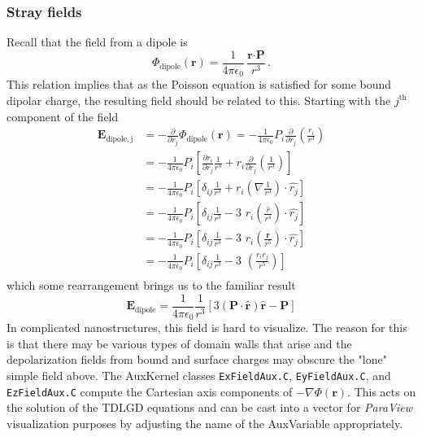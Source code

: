 \documentclass[16pt]{article} %
\begin{document}
\subsubsection{Stray fields}
%
Recall that the field from a dipole is
%
$$\Phi_\mathrm{dipole}\left(\textbf{r} \right) = \frac{1}{4\pi \epsilon_0} \frac{\textbf{r} \cdot \textbf{P}}{r^3}.$$
%
This relation implies that as the Poisson equation is satisfied for some bound dipolar charge, the resulting field should be related to this.
%
Starting with the $j^\mathrm{th}$ component of the field
%
\begin{align}\tag{123}
\textbf{E}_\mathrm{dipole,j} &= - \frac{\partial}{\partial r_j} \Phi_\mathrm{dipole} \left(\textbf{r} \right) = - \frac{1}{4 \pi \epsilon_0} P_i \frac{\partial}{\partial r_j} \left(\frac{r_i}{r^3} \right)\\ \nonumber
&= - \frac{1}{4 \pi \epsilon_0} P_i \left[ \frac{\partial r_i}{\partial r_j} \frac{1}{r^3} + r_i \frac{\partial}{\partial r_j} \left(\frac{1}{r^3} \right) \right]\\ \nonumber
&= - \frac{1}{4 \pi \epsilon_0} P_i \left[ \delta_{ij}\frac{1}{r^3} + r_i \left(\nabla \frac{1}{r^3} \right) \cdot \hat{r_j}  \right]\\ \nonumber
&= - \frac{1}{4 \pi \epsilon_0} P_i \left[ \delta_{ij}\frac{1}{r^3} - 3 \,\, r_i \left(\frac{\hat{r}}{r^4} \right) \cdot \hat{r_j}  \right]\\ \nonumber
&= - \frac{1}{4 \pi \epsilon_0} P_i \left[ \delta_{ij}\frac{1}{r^3} - 3 \,\, r_i \left(\frac{\textbf{r}}{r^5} \right) \cdot \hat{r_j}  \right]\\ \nonumber
&= - \frac{1}{4 \pi \epsilon_0} P_i \left[ \delta_{ij}\frac{1}{r^3} - 3 \,\, \left(\frac{r_i r_j}{r^5} \right)  \right]\\ \nonumber
\end{align}
%
which some rearrangement brings us to the familiar result
%
$$\textbf{E}_\mathrm{dipole} = \frac{1}{4 \pi \epsilon_0} \frac{1}{r^3} \left[3 \left(\textbf{P} \cdot \hat{\textbf{r}} \right) \hat{\textbf{r}} - \textbf{P} \right]$$
%
In complicated nanostructures, this field is hard to visualize.
%
The reason for this is that there may be various types of domain walls that arise and the depolarization fields from bound and surface charges may obscure the "lone" simple field above.
%
The AuxKernel classes \texttt{ExFieldAux.C}, \texttt{EyFieldAux.C}, and \texttt{EzFieldAux.C} compute the Cartesian axis components of $-\nabla \Phi (\textbf{r})$.
%
This acts on the solution of the TDLGD equations and can be cast into a vector for \emph{ParaView} visualization purposes by adjusting the name of the AuxVariable appropriately.
%
\end{document}
